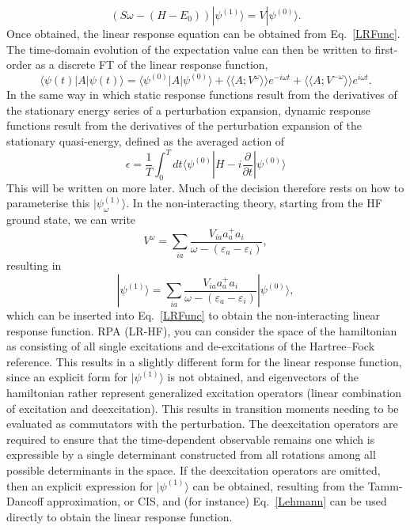 \documentclass[a4paper,oneside,11pt]{article}
\numberwithin{equation}{section}
\begin{document}
\begin{equation}
(S \omega - (H - E_0))|\psi^{(1)}\rangle = V|\psi^{(0)} \rangle.     \label{LinearSystem}
\end{equation}
Once obtained, the linear response equation can be obtained from Eq.~\ref{LRFunc}.
The time-domain evolution of the expectation value can then be written to first-order as a discrete FT of the linear response function,
\begin{equation}
\langle \psi(t) | A | \psi(t) \rangle = \langle \psi^{(0)} | A | \psi^{(0)} \rangle + \langle \langle A ; V^{\omega} \rangle \rangle e^{-i \omega t} + \langle \langle A ; V^{-\omega} \rangle \rangle e^{i \omega t} .
\end{equation}
In the same way in which static response functions result from the derivatives of the stationary energy series of a perturbation expansion, dynamic response functions result from the 
derivatives of the perturbation expansion of the stationary quasi-energy, defined as the averaged action of
\begin{equation}
\epsilon = \frac{1}{T}\int_0^T dt \langle \psi^{(0)} | H-i\frac{\partial}{\partial t} | \psi^{(0)} \rangle
\end{equation}
This will be written on more later.
Much of the decision therefore rests on how to parameterise this $|\psi^{(1)}_{\omega} \rangle$. In the non-interacting theory, starting from the HF ground state, we can write
\begin{equation}
V^{\omega} = \sum_{ia} \frac{V_{ia} a_a^{+} a_i}{\omega - (\varepsilon_a - \varepsilon_i)}, \label{NonInteractingOperator}
\end{equation}
resulting in
\begin{equation}
|\psi^{(1)} \rangle = \sum_{ia} \frac{V_{ia} a_a^{+} a_i}{\omega - (\varepsilon_a - \varepsilon_i)} |\psi^{(0)} \rangle,    \label{NonInteractingPhi1}
\end{equation}
which can be inserted into Eq.~\ref{LRFunc} to obtain the non-interacting linear response function.
RPA (LR-HF), you can consider the space of the hamiltonian as consisting of all single excitations and de-excitations of the Hartree--Fock reference. This results in a slightly different
form for the linear response function, since an explicit form for $|\psi^{(1)} \rangle$ is not obtained, and eigenvectors of the hamiltonian rather represent generalized excitation operators 
(linear combination of excitation and deexcitation).
This results in transition moments needing to be evaluated as commutators with the perturbation. The deexcitation operators are required to ensure that the time-dependent observable remains
one which is expressible by a single determinant constructed from all rotations among all possible determinants in the space. If the deexcitation operators are omitted, then an explicit 
expression for $|\psi^{(1)} \rangle$
can be obtained, resulting from the Tamm-Dancoff approximation, or CIS, and (for instance) Eq.~\ref{Lehmann} can be used directly to obtain the linear response function.
\end{document}
